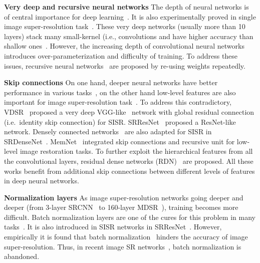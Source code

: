 \documentclass{article}
\begin{document}
\textbf{Very deep and recursive neural networks} The depth of neural networks is of central importance for deep learning~\cite{he2016deep, simonyan2014very, szegedy2017inception}. It is also experimentally proved in single image super-resolution task~\cite{fan2017balanced, kim2016accurate, ledig2016photo, lim2017enhanced, tai2017memnet, tong2017image, 2018arXiv180208797Z}. These very deep networks (usually more than 10 layers) stack many small-kernel (i.e.,  convolutions and have higher accuracy than shallow ones~\cite{dong2016accelerating, shi2016real}. However, the increasing depth of convolutional neural networks introduces over-parameterization and difficulty of training. To address these issues, recursive neural networks~\cite{kim2016deeply, tai2017image} are proposed by re-using weights repeatedly.

\textbf{Skip connections} On one hand, deeper neural networks have better performance in various tasks~\cite{simonyan2014very}, on the other hand low-level features are also important for image super-resolution task~\cite{2018arXiv180208797Z}. To address this contradictory,  VDSR~\cite{kim2016accurate} proposed a very deep VGG-like~\cite{simonyan2014very} network with global residual connection (i.e.\ identity skip connection) for SISR. SRResNet~\cite{ledig2016photo} proposed a ResNet-like~\cite{he2016deep} network. Densely connected networks~\cite{huang2017densely} are also adapted for SISR in SRDenseNet~\cite{tong2017image}. MemNet~\cite{tai2017memnet} integrated skip connections and recursive unit for low-level image restoration tasks. To further exploit the hierarchical features from all the convolutional layers, residual dense networks (RDN)~\cite{2018arXiv180208797Z} are proposed. All these works benefit from additional skip connections between different levels of features in deep neural networks.

\textbf{Normalization layers} As image super-resolution networks going deeper and deeper (from 3-layer SRCNN~\cite{dong2014learning} to 160-layer MDSR~\cite{lim2017enhanced}), training becomes more difficult. Batch normalization layers are one of the cures for this problem in many tasks~\cite{he2016deep, szegedy2017inception}. It is also introduced in SISR networks in SRResNet~\cite{ledig2016photo}. However, empirically it is found that batch normalization~\cite{ioffe2015batch} hinders the accuracy of image super-resolution. Thus, in recent image SR networks~\cite{fan2017balanced, lim2017enhanced, 2018arXiv180208797Z}, batch normalization is abandoned.
\end{document}
